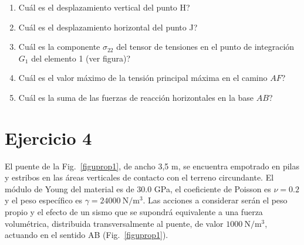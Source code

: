 \documentclass[a4paper,12pt]{article}
\begin{document}
\begin{enumerate}
\item Cuál es el desplazamiento vertical del punto H?
  \begin{multicols}{4}
\columnbreak
{}
\columnbreak
{}
\columnbreak
{}
  \end{multicols}
\item Cuál es el desplazamiento horizontal del punto J?
  \begin{multicols}{4}
\columnbreak
{} %
\columnbreak
{}
\columnbreak
{}
  \end{multicols}
\item Cuál es la componente $\sigma_{22}$ del tensor de tensiones en el punto de integración $G_1$ del elemento 1 (ver figura)?
  \begin{multicols}{4}
\columnbreak
{}
\columnbreak
{}
\columnbreak
{}
  \end{multicols}
\item Cuál es el valor máximo de la tensión principal máxima en el camino $AF$?
  \begin{multicols}{4}
\columnbreak
{} %
\columnbreak
{}
\columnbreak
{}
\end{multicols}
\item Cuál es la suma de las fuerzas de reacción horizontales en la base $AB$?
  \begin{multicols}{4}
\columnbreak
{}
\columnbreak
{}
\columnbreak
{}
  \end{multicols}
\end{enumerate}


\vspace{10mm}

\section{Ejercicio 4}
El puente de la Fig.~\ref{figuprop1}, de ancho 3,5 m, se encuentra empotrado en pilas y estribos en las áreas verticales de contacto con el terreno circundante. El módulo de Young del material es de 30.0 GPa, el coeficiente de Poisson es $\nu=0.2$ y el peso específico es $\gamma=24000 \mathrm{~N} / \mathrm{m}^{3}$. Las acciones a considerar serán el peso propio y el efecto de un sismo que se supondrá equivalente a una fuerza volumétrica, distribuida transversalmente al puente, de valor $1000 \mathrm{~N} / \mathrm{m}^{3}$, actuando en el sentido AB (Fig.~\ref{figuprop1}).
\end{document}
